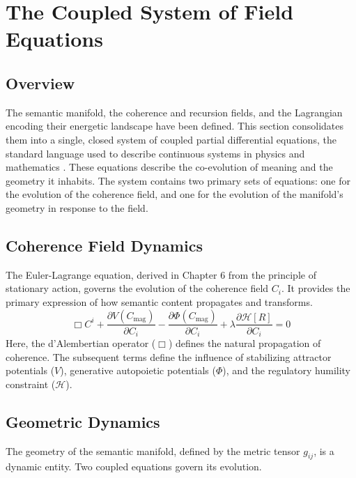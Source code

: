 \chapter{The Coupled System of Field Equations}

\section{Overview}

The semantic manifold, the coherence and recursion fields, and the Lagrangian encoding their energetic landscape have been defined. This section consolidates them into a single, closed system of coupled partial differential equations, the standard language used to describe continuous systems in physics and mathematics \autocite{Evans2010}. These equations describe the co-evolution of meaning and the geometry it inhabits. The system contains two primary sets of equations: one for the evolution of the coherence field, and one for the evolution of the manifold's geometry in response to the field.

\section{Coherence Field Dynamics}

The Euler-Lagrange equation, derived in Chapter 6 from the principle of stationary action, governs the evolution of the coherence field \(C_i\). It provides the primary expression of how semantic content propagates and transforms.
\begin{equation}
\Box C^i + \frac{\partial V(C_{\mathrm{mag}})}{\partial C_i} - \frac{\partial \Phi(C_{\mathrm{mag}})}{\partial C_i} + \lambda \frac{\partial \mathcal{H}[R]}{\partial C_i} = 0
\end{equation}
Here, the d'Alembertian operator (\(\Box\)) defines the natural propagation of coherence. The subsequent terms define the influence of stabilizing attractor potentials (\(V\)), generative autopoietic potentials (\(\Phi\)), and the regulatory humility constraint (\(\mathcal{H}\)).

\section{Geometric Dynamics}

The geometry of the semantic manifold, defined by the metric tensor \(g_{ij}\), is a dynamic entity. Two coupled equations govern its evolution.

